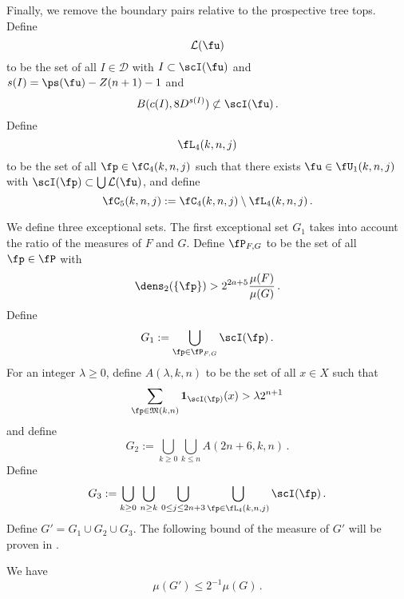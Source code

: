 Finally, we remove the boundary pairs relative to the prospective tree tops. Define
\begin{equation}
    \label{eq-L-def}
    \mathcal{L}(\fu)
\end{equation}
to be the set of all $I \in \mathcal{D}$ with $I \subset \scI(\fu)$ and $s(I) = \ps(\fu) - Z(n+1) - 1$ and
\begin{equation}
    B(c(I), 8 D^{s(I)})\not \subset \scI(\fu)\, .
\end{equation}
Define
\begin{equation}
    \label{eq-L4-def}
    \fL_4(k,n,j)
\end{equation}
to be the set of all $\fp\in \fC_4(k,n,j)$ such that there exists
$\fu\in \fU_1(k,n,j)$
with $\scI(\fp) \subset \bigcup \mathcal{L}(\fu)$, and define
\begin{equation}\label{defc5}
\fC_5(k,n,j):=\fC_4(k,n,j)
  \setminus \fL_4(k,n,j)\, .
\end{equation}


We define three exceptional sets.
The first exceptional set $G_1$ takes into account the ratio of the measures of $F$ and $G$.
Define $\fP_{F,G}$ to be the set of all $\fp\in \fP$
with
\begin{equation}
    \dens_2(\{\fp\})> 2^{2a+5}\frac{\mu(F)}{\mu(G)}\,.
\end{equation}
Define
\begin{equation}\label{definegone}
    G_1:=\bigcup_{\fp\in \fP_{F,G} }\scI(\fp)\, .
\end{equation}
For an integer $\lambda\ge 0$, define $A(\lambda,k,n)$ to be the set
of all $x\in X$ such that
\begin{equation}
    \label{eq-Aoverlap-def}
    \sum_{\fp \in \mathfrak{M}(k,n)}\mathbf{1}_{\scI(\fp)}(x)>\lambda 2^{n+1}
\end{equation}
and define
\begin{equation}\label{definegone2}
    G_2:=
\bigcup_{k\ge 0}\bigcup_{k\le n}
A(2n+6,k,n)\, .
\end{equation}
Define
    \begin{equation}\label{defineg3}
        G_3 :=
        \bigcup_{k\ge 0}\, \bigcup_{n \geq k}\,
        \bigcup_{0\le j\le 2n+3}
        \bigcup_{\fp \in \fL_4 (k,n,j)}
        \scI(\fp)\, .
     \end{equation}
Define $G'=G_1\cup G_2 \cup G_3$. The following bound of the measure of $G'$ will be proven in .
\begin{lemma}
    \label{exceptional-set}
    \leanok
    We have
    \begin{equation}
        \mu(G')\le 2^{-1}\mu(G)\, .
    \end{equation}
\end{lemma}

